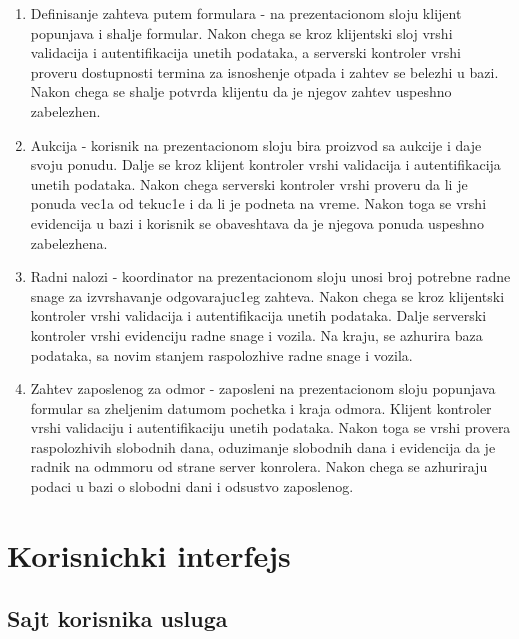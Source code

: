 \documentclass[10 pt]{article}
\begin{document}
		\begin{enumerate}
			\item Definisanje zahteva putem formulara - na prezentacionom sloju klijent popunjava i shalje formular. Nakon chega se kroz klijentski sloj vrshi validacija i autentifikacija unetih podataka, a serverski kontroler vrshi proveru dostupnosti termina za isnoshenje otpada i zahtev se belezhi u bazi. Nakon chega se shalje potvrda klijentu da je njegov zahtev uspeshno zabelezhen.
			
			\item Aukcija - korisnik na prezentacionom sloju bira proizvod sa aukcije i daje svoju ponudu. Dalje se kroz klijent kontroler vrshi validacija i autentifikacija unetih podataka. Nakon chega serverski kontroler vrshi proveru da li je ponuda vec1a od tekuc1e i da li je podneta na vreme. Nakon toga se vrshi evidencija u bazi i korisnik se obaveshtava da je njegova ponuda uspeshno zabelezhena.
			
			\item Radni nalozi - koordinator na prezentacionom sloju unosi broj potrebne radne snage za izvrshavanje odgovarajuc1eg zahteva. Nakon chega se kroz klijent{s}ki kontroler vrshi validacija i autentifikacija unetih podataka. Dalje serverski kontroler vrshi evidenciju radne snage i vozila. Na kraju, se azhurira baza podataka, sa novim stanjem raspolozhive radne snage i vozila.
			
			\item Zahtev zaposlenog za odmor - zaposleni na prezentacionom sloju popunjava formular sa zheljenim datumom pochetka i kraja odmora. Klijent kontroler vrshi validaciju i autentifikaciju unetih podataka. Nakon toga se vrshi provera raspolozhivih slobodnih dana, oduzimanje slobodnih dana i evidencija da je radnik na odmmoru od strane server konrolera. Nakon chega se azhuriraju podaci u bazi o slobodni dani i odsustvo zaposlenog.
			
		\end{enumerate}
	
	\newpage
	\section{Korisnichki interfejs}
	
	\subsection{Sajt korisnika usluga}
	
\end{document}
